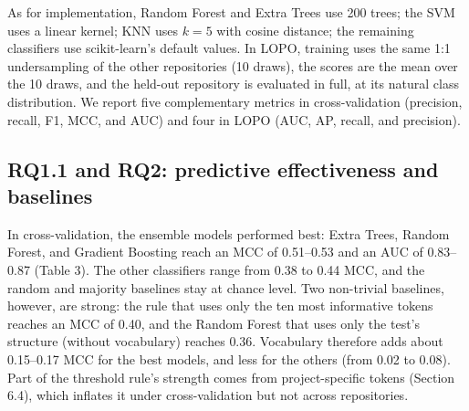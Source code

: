 As for implementation, Random Forest and Extra Trees use 200 trees; the SVM uses a linear kernel; KNN uses $k = 5$ with cosine distance; the remaining classifiers use scikit-learn's default values. In LOPO, training uses the same 1:1 undersampling of the other repositories (10 draws), the scores are the mean over the 10 draws, and the held-out repository is evaluated in full, at its natural class distribution. We report five complementary metrics in cross-validation (precision, recall, F1, MCC, and AUC) and four in LOPO (AUC, AP, recall, and precision).

\subsection{RQ1.1 and RQ2: predictive effectiveness and baselines}
In cross-validation, the ensemble models performed best: Extra Trees, Random Forest, and Gradient Boosting reach an MCC of 0.51--0.53 and an AUC of 0.83--0.87 (Table 3). The other classifiers range from 0.38 to 0.44 MCC, and the random and majority baselines stay at chance level. Two non-trivial baselines, however, are strong: the rule that uses only the ten most informative tokens reaches an MCC of 0.40, and the Random Forest that uses only the test's structure (without vocabulary) reaches 0.36. Vocabulary therefore adds about 0.15--0.17 MCC for the best models, and less for the others (from 0.02 to 0.08). Part of the threshold rule's strength comes from project-specific tokens (Section 6.4), which inflates it under cross-validation but not across repositories.

